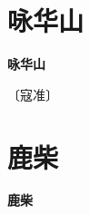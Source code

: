 \documentclass[12pt,UTF-8,openany,fontset=none]{ctexbook}
\begin{document}
\vspace{8pt}
\clearpage


\section{咏华山}



\begin{center}
    {\bfseries 咏华山}
\end{center}

\begin{center}
    \vspace{10pt}
    
    \begin{large}
        
        〔寇准〕
        
    \end{large}
    
    \vspace{8pt}
    
    \begin{huge}
        
        \phantom{。}

        \phantom{。}
        
        \phantom{。}

        \phantom{。}
        
    \end{huge}
    
\end{center}

\vspace{8pt}
\clearpage


\section{鹿柴}



\begin{center}
    {\bfseries 鹿柴}
\end{center}
\end{document}
